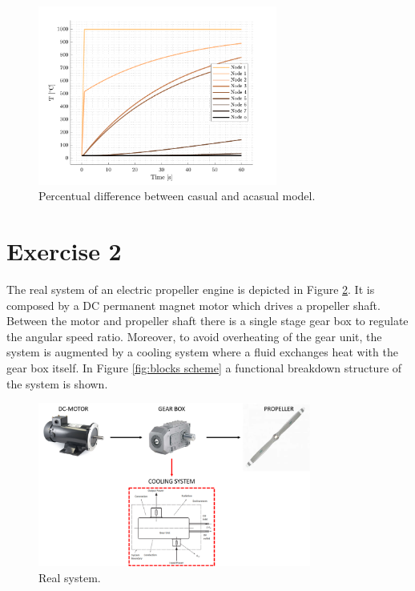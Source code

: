 \documentclass[11pt,a4paper,oneside]{article}
\begin{document}
\begin{figure}[h!]
    \centering
        \includegraphics[width = 0.7\textwidth]{gfx/ex1-4.pdf}
        \caption{Percentual difference between casual and acasual model.}\label{fig:ex1-4}
\end{figure}


\clearpage
\section*{Exercise 2}
The real system of an electric propeller engine is depicted in Figure \ref{fig:propeller}. It is composed by a DC permanent magnet motor which drives a propeller shaft. Between the motor and propeller shaft there is a single stage gear box to regulate the angular speed ratio. Moreover, to avoid overheating of the gear unit, the system is augmented by a cooling system where a fluid exchanges heat with the gear box itself. In Figure \ref{fig:blocks scheme} a functional breakdown structure of the system is shown. 



\begin{figure}[h!]
\centering
\includegraphics[width=0.8\textwidth]{gfx/RealSystem_msas.png}
\caption{\label{fig:propeller} Real system.}
\end{figure}
\end{document}
